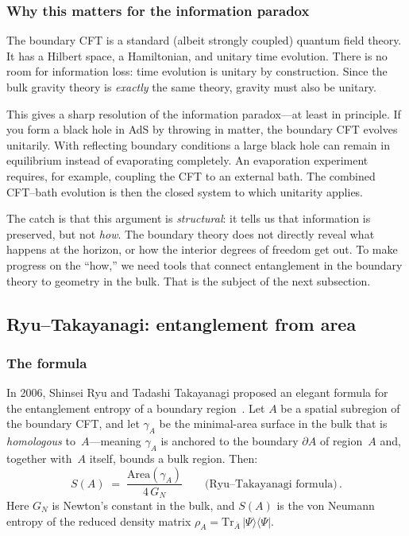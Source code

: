 \documentclass[11pt,letterpaper]{article}
\theoremstyle{plain}
\theoremstyle{definition}
\theoremstyle{remark}
\begin{document}
\subsubsection*{Why this matters for the information paradox}

The boundary CFT is a standard (albeit strongly coupled) quantum field
theory.  It has a Hilbert space, a Hamiltonian, and unitary time
evolution.  There is no room for information loss: time evolution is
unitary by construction.  Since the bulk gravity theory is
\emph{exactly} the same theory, gravity must also be unitary.

This gives a sharp resolution of the information paradox---at least in
principle.  If you form a black hole in AdS by throwing in matter, the
boundary CFT evolves unitarily. With reflecting boundary conditions a
large black hole can remain in equilibrium instead of evaporating completely.
An evaporation experiment requires, for example, coupling the CFT to an
external bath. The combined CFT--bath evolution is then the closed system
to which unitarity applies.

The catch is that this argument is \emph{structural}: it tells us that
information is preserved, but not \emph{how}.  The boundary theory does
not directly reveal what happens at the horizon, or how the interior
degrees of freedom get out.  To make progress on the ``how,'' we need
tools that connect entanglement in the boundary theory to geometry in
the bulk.  That is the subject of the next subsection.


\subsection{Ryu--Takayanagi: entanglement from area}
\label{subsec04:rt}

\subsubsection*{The formula}

In 2006, Shinsei Ryu and Tadashi Takayanagi proposed an elegant
formula for the entanglement entropy of a boundary
region~\citeyearpar{ryutakayanagi2006}.  Let $A$ be a spatial subregion of
the boundary CFT, and let $\gamma_{A}$ be the minimal-area surface in
the bulk that is \emph{homologous} to~$A$---meaning $\gamma_{A}$ is
anchored to the boundary $\partial A$ of region~$A$ and, together
with~$A$ itself, bounds a bulk region.  Then:
\begin{equation}
\label{eq04:rt}
\boxed{
S(A) \;=\; \frac{\mathrm{Area}(\gamma_{A})}{4\,G_{N}}
}
\qquad\text{(Ryu--Takayanagi formula)}\,.
\end{equation}
Here $G_{N}$ is Newton's constant in the bulk, and $S(A)$ is the von
Neumann entropy of the reduced density matrix $\rho_{A} =
\mathrm{Tr}_{\bar{A}}\,|\Psi\rangle\langle\Psi|$.
\end{document}
